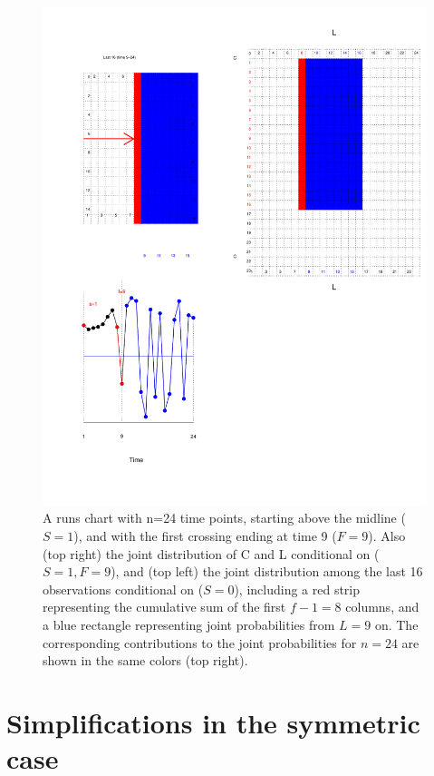 \begin{figure}[htbp]
  \centering
  \caption{A runs chart with n=24 time points, starting above the 
  midline ($S=1$), and with the first crossing ending at time 9 ($F=9$). Also (top right) the joint distribution of C and L conditional on ($S=1, F=9$), and (top left) the joint distribution among the last 16 observations conditional on ($S=0$), including a red strip representing the cumulative sum of the first $f-1=8$ columns, and a blue rectangle representing joint probabilities from $L=9$ on. The corresponding contributions to the joint probabilities for $n=24$ are shown in the same colors (top right).}
  \label{figure:rch2}
  \includegraphics[width=\textwidth]{run24case2}
\end{figure}

\section{Simplifications in the symmetric case}


